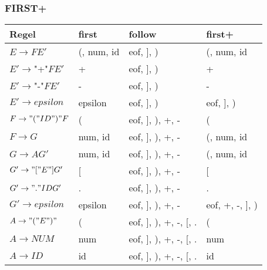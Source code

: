 \subsubsection{FIRST+}
\begin{tabular}{llll}
 Regel & first &  follow &  first+ \\
\hline
$E  \rightarrow F E'          $ & (, num, id    & eof, ], )              & (, num, id \\
$E' \rightarrow $"+"$ F E'    $ & +             & eof, ], )              & + \\
$E' \rightarrow $"-"$ F E'    $ & -             & eof, ], )              & - \\
$E' \rightarrow epsilon       $ & epsilon       & eof, ], )              & eof, ], ) \\
$F  \rightarrow "(" ID ")" F  $ & (             & eof, ], ), +, -        & ( \\
$F  \rightarrow G             $ & num, id       & eof, ], ), +, -        & (, num, id \\
$G  \rightarrow A G'          $ & num, id       & eof, ], ), +, -        & (, num, id \\
$G' \rightarrow "[" E "] G'   $ & [             & eof, ], ), +, -        & [ \\
$G' \rightarrow "." ID G'     $ & .             & eof, ], ), +, -        & . \\
$G' \rightarrow epsilon       $ & epsilon       & eof, ], ), +, -        & eof, +, -, ], ) \\
$A  \rightarrow "(" E ")"     $ & (             & eof, ], ), +, -, [, .  & ( \\
$A  \rightarrow NUM           $ & num           & eof, ], ), +, -, [, .  & num \\
$A  \rightarrow ID            $ & id            & eof, ], ), +, -, [, .  &  id \\
\end{tabular}
